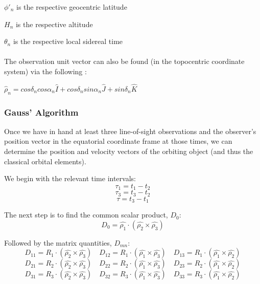 \documentclass[11pt,twoside,letterpaper]{article}
\begin{document}
  \(\phi'_n\) is the respective geocentric latitude
  
  \(H_n\) is the respective altitude
  
  \(\theta_n\) is the respective local sidereal time

  \paragraph{}
  
  The observation unit vector can also be found (in the topocentric
  coordinate system) via the following  \cite{Wikipedia_2018}:

  $\hat{\rho}_n = cos\delta_ncos\alpha_n\hat{I} + cos\delta_nsin\alpha_n\hat{J} + sin\delta_n\hat{K}$

  \subsubsection{Gauss' Algorithm}
  Once we have in hand at least three line-of-sight observations and
  the observer's position vector in the equatorial coordinate frame at
  those times, we can determine the position and velocity vectors of
  the orbiting object (and thus the classical orbital elements).

  We begin with the relevant time intervals:
  \begin{equation}
    \tau_1 = t_1 - t_2
  \end{equation}
  \begin{equation}
    \tau_3 = t_3 - t_2
  \end{equation}
  \begin{equation}
    \tau = t_3 - t_1
  \end{equation}

  The next step is to find the common scalar product, $D_0$:
  \begin{equation}
    D_0 = \hat{\rho_1}\cdot(\hat{\rho_2}\times\hat{\rho_3})
  \end{equation}

  Followed by the matrix quantities, $D_{mn}$:
  \begin{equation}
    D_{11} = R_1\cdot(\hat{\rho_2}\times\hat{\rho_3})
    \quad D_{12} = R_1\cdot(\hat{\rho_1}\times\hat{\rho_3})
    \quad D_{13} = R_1\cdot(\hat{\rho_1}\times\hat{\rho_2})
  \end{equation}
  \begin{equation}
    D_{21} = R_2\cdot(\hat{\rho_2}\times\hat{\rho_3})
    \quad D_{22} = R_2\cdot(\hat{\rho_1}\times\hat{\rho_3})
    \quad D_{23} = R_2\cdot(\hat{\rho_1}\times\hat{\rho_2})
  \end{equation}
  \begin{equation}
    D_{31} = R_3\cdot(\hat{\rho_2}\times\hat{\rho_3})
    \quad D_{32} = R_3\cdot(\hat{\rho_1}\times\hat{\rho_3})
    \quad D_{33} = R_3\cdot(\hat{\rho_1}\times\hat{\rho_2})
  \end{equation}
\end{document}
